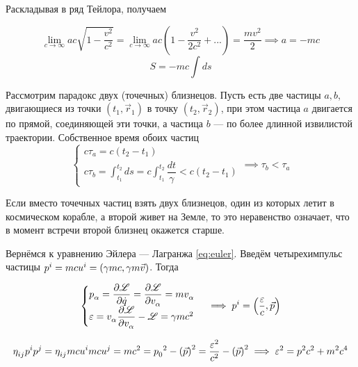 \documentclass{article}
\begin{document}
Раскладывая в ряд Тейлора, получаем

\begin{equation*}
    \lim_{c\to\infty}ac\sqrt{1-\frac{v^2}{c^2}}=\lim_{c\to\infty}ac\left(1-\frac{v^2}{2c^2}+...\right)=\frac{mv^2}{2}\implies a=-mc
\end{equation*}
\begin{equation}\label{eq:S_after}
    S=-mc\int ds
\end{equation}

Рассмотрим парадокс двух (точечных) близнецов. Пусть есть две частицы $a, b$, двигающиеся из точки $\left(t_1,\vec{r}_1\right)$ в точку $\left(t_2,\vec{r}_2\right)$, при этом частица $a$ двигается по прямой, соединяющей эти точки, а частица $b$ --- по более длинной извилистой траектории. Собственное время обоих частиц
\begin{equation*}
    \begin{cases}
    c\tau_a=c\left(t_2-t_1\right)\\
    c\tau_b=\int_{t_1}^{t_2}ds=c\int_{t_1}^{t_2}\dfrac{dt}{\gamma}<c\left(t_2-t_1\right)
    \end{cases}\implies \tau_b<\tau_a
\end{equation*}

Если вместо точечных частиц взять двух близнецов, один из которых летит в космическом корабле, а второй живет на Земле, то это неравенство означает, что в момент встречи второй близнец окажется старше.

Вернёмся к уравнению Эйлера --- Лагранжа \eqref{eq:euler}. Введём четырехимпульс частицы $\tensor{p}{^i}=mc\tensor{u}{^i}=\left(\gamma mc, \gamma m\vec{v}\right)$. Тогда

\begin{equation*}
    \begin{cases}
    \tensor{p}{_\alpha}=\dfrac{\partial\mathscr{L}}{\partial\dot{q}}=\dfrac{\partial\mathscr{L}}{\partial\tensor{v}{_\alpha}}=m\tensor{v}{_\alpha}\\
    \varepsilon=\tensor{v}{_\alpha}\dfrac{\partial\mathscr{L}}{\partial\tensor{v}{_\alpha}}-\mathscr{L}=\gamma mc^2
    \end{cases}\implies \tensor{p}{^i}=\left(\frac{\varepsilon}{c}, \vec{p}\right)
\end{equation*}

\begin{equation*}
    \tensor{\eta}{_i_j}\tensor{p}{^i}\tensor{p}{^j}=\tensor{\eta}{_i_j}mc\tensor{u}{^i}mc\tensor{u}{^j}=mc^2=\tensor{p}{_0}^2-\left(\vec{p}\right)^2=\dfrac{\varepsilon^2}{c^2}-\left(\vec{p}\right)^2
    \implies \varepsilon^2=p^2c^2+m^2c^4
\end{equation*}
\end{document}
